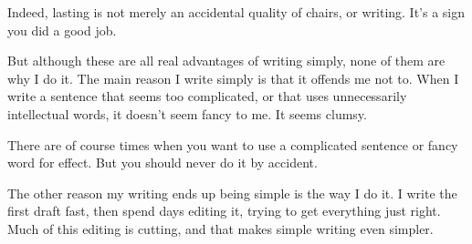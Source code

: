 Indeed, lasting is not merely an accidental quality of chairs, or
writing. It's a sign you did a good job.

But although these are all real advantages of writing simply, none of
them are why I do it. The main reason I write simply is that it offends
me not to. When I write a sentence that seems too complicated, or that
uses unnecessarily intellectual words, it doesn't seem fancy to me. It
seems clumsy.

There are of course times when you want to use a complicated sentence or
fancy word for effect. But you should never do it by accident.

The other reason my writing ends up being simple is the way I do it. I
write the first draft fast, then spend days editing it, trying to get
everything just right. Much of this editing is cutting, and that makes
simple writing even simpler.